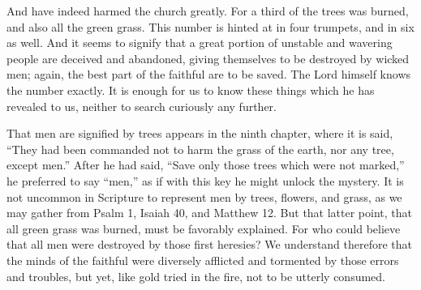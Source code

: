 And have indeed harmed the church greatly. For a third of the trees was burned, and also all the green grass. This number is hinted at in four trumpets, and in six as well. And it seems to signify that a great portion of unstable and wavering people are deceived and abandoned, giving themselves to be destroyed by wicked men; again, the best part of the faithful are to be saved. The Lord himself knows the number exactly. It is enough for us to know these things which he has revealed to us, neither to search curiously any further.

That men are signified by trees appears in the ninth chapter, where it is said, “They had been commanded not to harm the grass of the earth, nor any tree, except men.” After he had said, “Save only those trees which were not marked,” he preferred to say “men,” as if with this key he might unlock the mystery. It is not uncommon in Scripture to represent men by trees, flowers, and grass, as we may gather from Psalm 1, Isaiah 40, and Matthew 12. But that latter point, that all green grass was burned, must be favorably explained. For who could believe that all men were destroyed by those first heresies? We understand therefore that the minds of the faithful were diversely afflicted and tormented by those errors and troubles, but yet, like gold tried in the fire, not to be utterly consumed.

